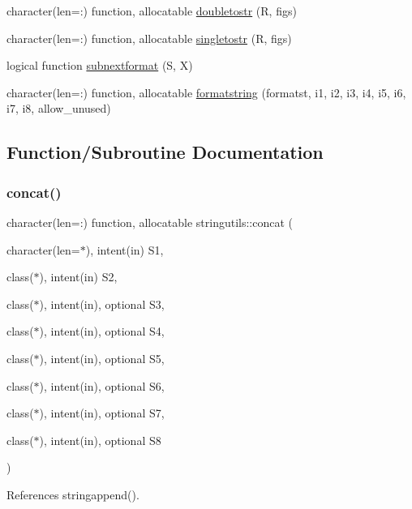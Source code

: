 \begin{DoxyCompactItemize}
character(len=\+:) function, allocatable \mbox{\hyperlink{namespacestringutils_adb471f3dd9f3594d60675ae521b568a7}{doubletostr}} (R, figs)
\item 
character(len=\+:) function, allocatable \mbox{\hyperlink{namespacestringutils_a9ee073baf898c055562e20577ad27013}{singletostr}} (R, figs)
\item 
logical function \mbox{\hyperlink{namespacestringutils_a052ed985538275100bc601b4bfffde94}{subnextformat}} (S, X)
\item 
character(len=\+:) function, allocatable \mbox{\hyperlink{namespacestringutils_a27d23a05ef709f393291b263dbbd78c3}{formatstring}} (formatst, i1, i2, i3, i4, i5, i6, i7, i8, allow\+\_\+unused)
\end{DoxyCompactItemize}


\subsection{Function/\+Subroutine Documentation}
\mbox{\label{namespacestringutils_a19e683b9de4f769c4fe0afc48a7b45d0}} 
\subsubsection{\texorpdfstring{concat()}{concat()}}
{\footnotesize\ttfamily character(len=\+:) function, allocatable stringutils\+::concat (\begin{DoxyParamCaption}\item[{character(len=$\ast$), intent(in)}]{S1,  }\item[{class($\ast$), intent(in)}]{S2,  }\item[{class($\ast$), intent(in), optional}]{S3,  }\item[{class($\ast$), intent(in), optional}]{S4,  }\item[{class($\ast$), intent(in), optional}]{S5,  }\item[{class($\ast$), intent(in), optional}]{S6,  }\item[{class($\ast$), intent(in), optional}]{S7,  }\item[{class($\ast$), intent(in), optional}]{S8 }\end{DoxyParamCaption})}



References stringappend().



